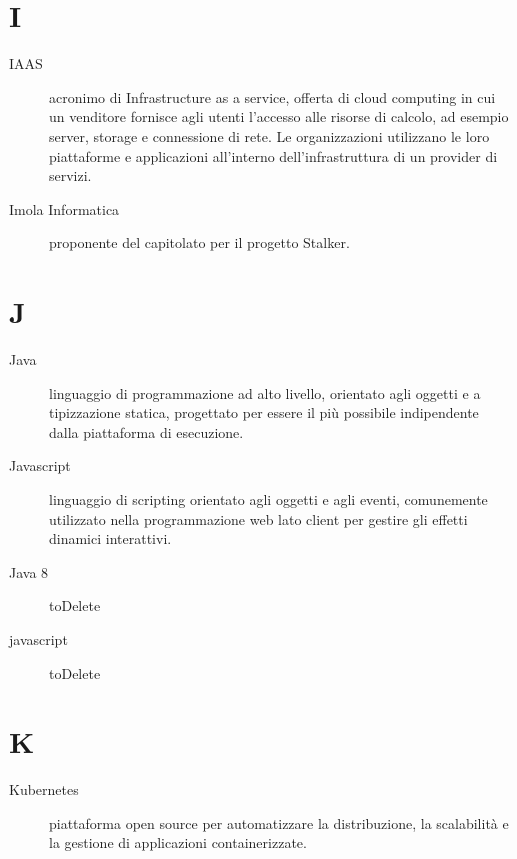 \documentclass{article}
\begin{document}
  \section{I}
  \begin{description}
    \item[IAAS] acronimo di Infrastructure as a service, offerta di cloud computing in cui un venditore fornisce agli utenti l'accesso alle risorse di calcolo, ad esempio server, storage e connessione di rete. Le organizzazioni utilizzano le loro piattaforme e applicazioni all'interno dell'infrastruttura di un provider di servizi.
    \item[Imola Informatica] proponente del capitolato per il progetto Stalker.
	\end{description}
  \section{J}
  \begin{description}
    \item[Java] linguaggio di programmazione ad alto livello, orientato agli oggetti e a tipizzazione statica, progettato per essere il più possibile indipendente dalla piattaforma di esecuzione.
    \item[Javascript] linguaggio di scripting orientato agli oggetti e agli eventi, comunemente utilizzato nella programmazione web lato client per gestire gli effetti dinamici interattivi.
    \item[Java 8] toDelete
    \item[javascript] toDelete
	\end{description}
  \section{K}
  \begin{description}
    \item[Kubernetes] piattaforma open source per automatizzare la distribuzione, la scalabilità e la gestione di applicazioni containerizzate.
	\end{description}
\end{document}
